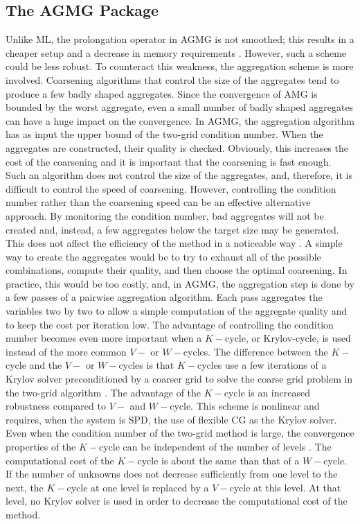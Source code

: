 \subsection{The AGMG Package}
Unlike ML, the prolongation operator in AGMG is not smoothed; this results in a
cheaper setup and a decrease in memory requirements \cite{agmg2}. However,
such a scheme could be less robust. To counteract this weakness, the
aggregation scheme is more involved. Coarsening algorithms that control
the size of the aggregates tend to produce a few badly shaped aggregates.
Since the convergence of AMG is bounded by the worst aggregate, even a small 
number of badly shaped aggregates can have a huge impact on
the convergence. In AGMG, the aggregation algorithm has as input the upper
bound of the two-grid condition number. When the aggregates are constructed,
their quality is checked. Obviously, this increases the cost of the coarsening
and it is important that the coarsening is fast enough. Such an 
algorithm does not control the size of the aggregates, and, therefore, it is 
difficult to control the speed of coarsening. However, controlling the condition 
number rather than the coarsening speed can be an effective alternative approach. By 
monitoring the condition number, bad aggregates will not be created and, instead, 
a few aggregates below the target size may be generated. This  
does not affect the efficiency of the method in a noticeable way \cite{agmg2}. 
A simple way to create the aggregates would be to try to exhaust all of the possible 
combinations, compute their quality, and then choose the optimal
coarsening. In practice, this would be too costly, and, in AGMG, the aggregation 
step is done by a few passes of a pairwise aggregation algorithm. Each pass
aggregates the variables two by two to allow a simple computation of the aggregate 
quality and to keep the cost per iteration low. The advantage of controlling the 
condition number becomes even more important when a $K-$cycle, or Krylov-cycle, is 
used instead of the more common $V-$ or $W-$cycles. The difference between the 
$K-$cycle and the $V-$ or $W-$cycles is that $K-$cycles use a 
few iterations of a Krylov solver preconditioned by a coarser grid to solve 
the coarse grid problem in the two-grid algorithm \cite{k_cycle}. The
advantage of the $K-$cycle is an increased robustness compared to $V-$ and
$W-$cycle. This scheme 
is nonlinear and requires, when the system is SPD, the use of flexible CG 
\cite{fcg,fcg_2,fcg_3,fcg_4} as the Krylov solver. Even when the condition 
number of the two-grid method is large, the convergence properties of the 
$K-$cycle can be independent of the number of levels \cite{k_cycle}. The 
computational cost of the $K-$cycle is about the same than that of a $W-$cycle. 
If the number of unknowns does not decrease sufficiently from one 
level to the next, the $K-$cycle at one level is replaced by a $V-$cycle at 
this level. At that level, no Krylov solver is used in order to decrease the
computational cost of the method. 


